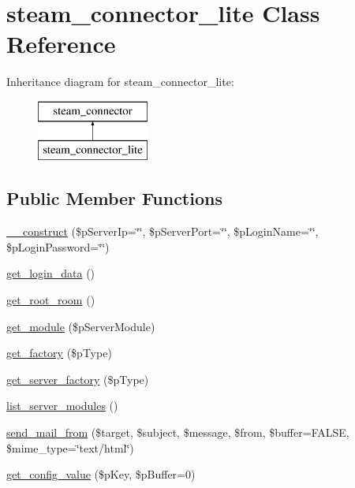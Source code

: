 \hypertarget{classsteam__connector__lite}{
\section{steam\_\-connector\_\-lite Class Reference}
\label{classsteam__connector__lite}
}
Inheritance diagram for steam\_\-connector\_\-lite:\begin{figure}[H]
\begin{center}
\leavevmode
\includegraphics[height=2.000000cm]{classsteam__connector__lite}
\end{center}
\end{figure}
\subsection*{Public Member Functions}
\begin{DoxyCompactItemize}
\item 
\hyperlink{classsteam__connector__lite_a935fef63a7fe9814ae8c0d07d5217584}{\_\-\_\-construct} (\$pServerIp=\char`\"{}\char`\"{}, \$pServerPort=\char`\"{}\char`\"{}, \$pLoginName=\char`\"{}\char`\"{}, \$pLoginPassword=\char`\"{}\char`\"{})
\item 
\hyperlink{classsteam__connector__lite_a3ae44976cd32754a8270bc6520114a06}{get\_\-login\_\-data} ()
\item 
\hyperlink{classsteam__connector__lite_ae226b50d2a19ee5062b5badf05eb7308}{get\_\-root\_\-room} ()
\item 
\hyperlink{classsteam__connector__lite_a99ba2faec7abe7fd8fb1eac1d45d023a}{get\_\-module} (\$pServerModule)
\item 
\hyperlink{classsteam__connector__lite_ad3c89cac4fc62c9a60640bac9770109c}{get\_\-factory} (\$pType)
\item 
\hyperlink{classsteam__connector__lite_a781ed9c54b5339b7db02c7cf6616407f}{get\_\-server\_\-factory} (\$pType)
\item 
\hyperlink{classsteam__connector__lite_acf4a0ecd61cceccd4c97cfa4460f76a9}{list\_\-server\_\-modules} ()
\item 
\hyperlink{classsteam__connector__lite_a706474e01339c465bc363c668dfab877}{send\_\-mail\_\-from} (\$target, \$subject, \$message, \$from, \$buffer=FALSE, \$mime\_\-type=\char`\"{}text/html\char`\"{})
\item 
\hyperlink{classsteam__connector__lite_a292705389084eaf719de264cc8adf23f}{get\_\-config\_\-value} (\$pKey, \$pBuffer=0)
\end{DoxyCompactItemize}


